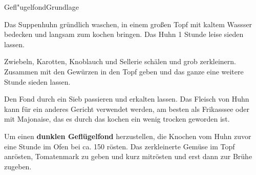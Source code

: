 \begin{recipe}{Gefl"ugelfond}{Grundlage}
  \label{Geflügelfond}
  \inglist

  \steps

  Das Suppenhuhn gründlich waschen, in einem großen Topf mit kaltem Wassser
  bedecken und langsam zum kochen bringen. Das Huhn 1 Stunde leise sieden
  lassen.

  Zwiebeln, Karotten, Knoblauch und Sellerie schälen und grob zerkleinern.
  Zusammen mit den Gewürzen in den Topf geben und das ganze eine weitere
  Stunde sieden lassen.

  Den Fond durch ein Sieb passieren und erkalten lassen. Das Fleisch von Huhn
  kann für ein anderes Gericht verwendet werden, am besten als Frikasssee
  oder mit Majonaise, das es durch das kochen ein wenig trocken geworden ist.

  Um einen \textbf{dunklen Geflügelfond} herzustellen, die Knochen vom Huhn
  zuvor eine Stunde im Ofen bei ca. 150 \celsius rösten. Das zerkleinerte
  Gemüse im Topf anrösten, Tomatenmark zu geben und kurz mitrösten und erst
  dann zur Brühe zugeben.

\end{recipe}
